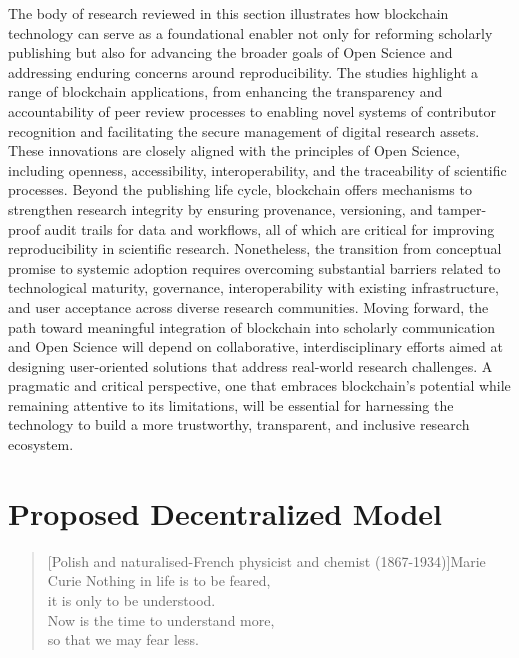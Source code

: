 \documentclass[final]{rc-book-2.14}
\begin{document}
The body of research reviewed in this section illustrates how blockchain technology can serve as a foundational enabler not only for reforming scholarly publishing but also for advancing the broader goals of Open Science and addressing enduring concerns around reproducibility. The studies highlight a range of blockchain applications, from enhancing the transparency and accountability of peer review processes to enabling novel systems of contributor recognition and facilitating the secure management of digital research assets. These innovations are closely aligned with the principles of Open Science, including openness, accessibility, interoperability, and the traceability of scientific processes. Beyond the publishing life cycle, blockchain offers mechanisms to strengthen research integrity by ensuring provenance, versioning, and tamper-proof audit trails for data and workflows, all of which are critical for improving reproducibility in scientific research. Nonetheless, the transition from conceptual promise to systemic adoption requires overcoming substantial barriers related to technological maturity, governance, interoperability with existing infrastructure, and user acceptance across diverse research communities. Moving forward, the path toward meaningful integration of blockchain into scholarly communication and Open Science will depend on collaborative, interdisciplinary efforts aimed at designing user-oriented solutions that address real-world research challenges. A pragmatic and critical perspective, one that embraces blockchain's potential while remaining attentive to its limitations, will be essential for harnessing the technology to build a more trustworthy, transparent, and inclusive research ecosystem.

\chapter{Proposed Decentralized Model}
\label{chp:proposed_model}
\begin{quotation}[Polish and naturalised-French physicist and chemist (1867-1934)]{Marie Curie}
    Nothing in life is to be feared, \\
    it is only to be understood. \\
    Now is the time to understand more, \\
    so that we may fear less.
\end{quotation}
\end{document}
